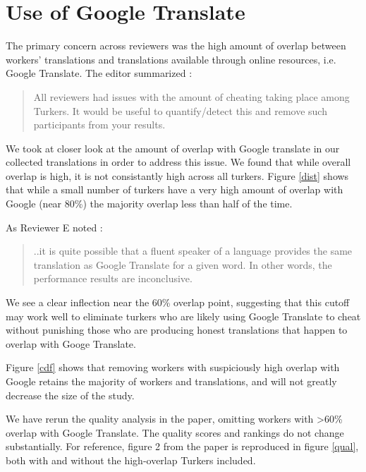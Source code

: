 \documentclass[11pt]{article}
\begin{document}
\section{Use of Google Translate}

The primary concern across reviewers was the high amount of overlap between workers' translations and translations available through online resources, i.e. Google Translate. The editor summarized : 
\begin{quote}
All reviewers had issues with the amount of cheating taking place among Turkers. It would be useful to quantify/detect this and remove such participants from your results.
\end{quote}

We took at closer look at the amount of overlap with Google translate in our collected translations in order to address this issue. We found that while overall overlap is high, it is not consistantly high across all turkers. Figure \ref{dist} shows that while a small number of turkers have a very high amount of overlap with Google (near 80\%) the majority overlap less than half of the time. 

As Reviewer E noted : 

\begin{quote}
..it is quite possible that a fluent speaker of a language provides the same translation as Google Translate for a given word.  In other words, the performance results are inconclusive.
\end{quote}

We see a clear inflection near the 60\% overlap point, suggesting that this cutoff may work well to eliminate turkers who are likely using Google Translate to cheat without punishing those who are producing honest translations that happen to overlap with Googe Translate.

Figure \ref{cdf} shows that removing workers with suspiciously high overlap with Google retains the majority of workers and translations, and will not greatly decrease the size of the study. 

We have rerun the quality analysis in the paper, omitting workers with \textgreater 60\% overlap with Google Translate. The quality scores and rankings do not change substantially. For reference, figure 2 from the paper is reproduced in figure \ref{qual}, both with and without the high-overlap Turkers included. 
\end{document}
